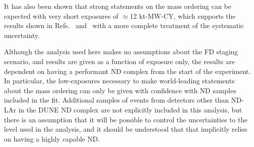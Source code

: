 It has also been shown that strong statements on the mass ordering can be expected with very short exposures of $\approx$12 kt-MW-CY, which supports the results shown in Refs.~\cite{Abi:2020qib} and~\cite{Abi:2020evt} with a more complete treatment of the systematic uncertainty.

Although the analysis used here makes no assumptions about the FD staging scenario, and results are given as a function of exposure only, the results are dependent on having a performant ND complex from the start of the experiment. In particular, the low-exposures necessary to make world-leading statements about the mass ordering can only be given with confidence with ND samples included in the fit. Additional samples of events from detectors other than ND-LAr in the DUNE ND complex are not explicitly included in this analysis, but there is an assumption that it will be possible to control the uncertainties to the level used in the analysis, and it should be understood that that implicitly relies on having a highly capable ND.
